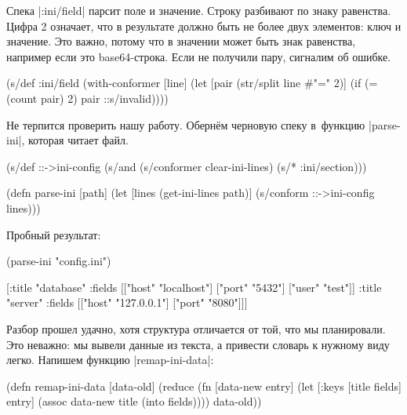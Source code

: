 
Спека \spverb|:ini/field| парсит поле и значение. Строку разбивают по знаку
равенства. Цифра 2 означает, что в результате должно быть не более двух
элементов: ключ и значение. Это важно, потому что в значении может быть знак
равенства, например если это base64-строка. Если не получили пару, сигналим об
ошибке.

\begin{english}
  \begin{clojure}
(s/def :ini/field
  (with-conformer [line]
    (let [pair (str/split line #"=" 2)]
      (if (= (count pair) 2)
        pair
        ::s/invalid))))
  \end{clojure}
\end{english}

Не терпится проверить нашу работу. Оберн\"{е}м черновую спеку в~функцию
\spverb|parse-ini|, которая читает файл.

\begin{english}
  \begin{clojure}
(s/def ::->ini-config
  (s/and
   (s/conformer clear-ini-lines)
   (s/* :ini/section)))

(defn parse-ini [path]
  (let [lines (get-ini-lines path)]
    (s/conform ::->ini-config lines)))
  \end{clojure}
\end{english}

\noindent
Пробный результат:

\begin{english}
  \begin{clojure}
(parse-ini "config.ini")

[{:title "database"
  :fields [["host" "localhost"]
           ["port" "5432"]
           ["user" "test"]]}
 {:title "server"
  :fields [["host" "127.0.0.1"]
           ["port" "8080"]]}]
  \end{clojure}
\end{english}

Разбор прошел удачно, хотя структура отличается от той, что мы планировали. Это
неважно: мы вывели данные из текста, а привести словарь к нужному виду
легко. Напишем функцию \spverb|remap-ini-data|:

\begin{english}
  \begin{clojure}
(defn remap-ini-data [data-old]
  (reduce
   (fn [data-new entry]
     (let [{:keys [title fields]} entry]
       (assoc data-new title (into {} fields))))
   {}
   data-old))
  \end{clojure}
\end{english}

